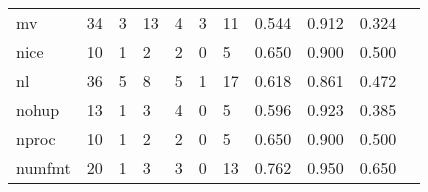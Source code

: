 \begin{longtable}{lp{1.2cm}p{1.2cm}p{1.2cm}p{1.2cm}p{1.2cm}p{1.2cm}p{1.2cm}p{1.2cm}p{1.2cm}p{1.2cm}}
mv        &                                    34 &                                                  3 &                                                 13 &                                                  4 &                                                  3 &                                                 11 &                                              0.544 &                                              0.912 &                                              0.324 \\
nice      &                                    10 &                                                  1 &                                                  2 &                                                  2 &                                                  0 &                                                  5 &                                              0.650 &                                              0.900 &                                              0.500 \\
nl        &                                    36 &                                                  5 &                                                  8 &                                                  5 &                                                  1 &                                                 17 &                                              0.618 &                                              0.861 &                                              0.472 \\
nohup     &                                    13 &                                                  1 &                                                  3 &                                                  4 &                                                  0 &                                                  5 &                                              0.596 &                                              0.923 &                                              0.385 \\
nproc     &                                    10 &                                                  1 &                                                  2 &                                                  2 &                                                  0 &                                                  5 &                                              0.650 &                                              0.900 &                                              0.500 \\
numfmt    &                                    20 &                                                  1 &                                                  3 &                                                  3 &                                                  0 &                                                 13 &                                              0.762 &                                              0.950 &                                              0.650 \\

\end{longtable}

